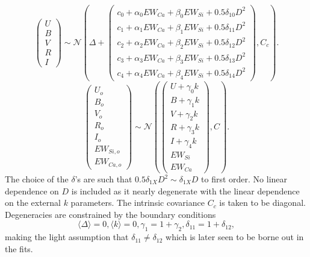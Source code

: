 \documentclass[11pt, oneside]{article}   	%
\begin{document}
\begin{equation*}
\left(
\begin{matrix}
U\\B\\V\\R\\I
\end{matrix}
\right) \sim \mathcal{N}
\left(
\Delta +
\left(
\begin{matrix}
c_0+\alpha_0 EW_{Ca} + \beta_0 EW_{Si}  +0.5 \delta_{10} D^2\\
c_1+\alpha_1 EW_{Ca} + \beta_1 EW_{Si}  +0.5 \delta_{11} D^2\\
c_2+\alpha_2 EW_{Ca} + \beta_2 EW_{Si} +0.5 \delta_{12} D^2\\
c_3+\alpha_3 EW_{Ca} + \beta_3 EW_{Si}  +0.5 \delta_{13} D^2\\
c_4+\alpha_4 EW_{Ca} + \beta_4 EW_{Si}  +0.5 \delta_{14} D^2
\end{matrix}
\right)
,C_{c}
\right).
\end{equation*}
\begin{equation*}
\left(
\begin{matrix}
U_o  \\B_o\\ V_o\\R_o\\I_o\\EW_{Si, o}\\ EW_{Ca, o}
\end{matrix}
\right) \sim \mathcal{N}
\left(
\left(
\begin{matrix}
U +\gamma_0 k \\B +\gamma_1 k \\V+\gamma_2 k\\R+\gamma_3 k\\I+\gamma_4 k\\
EW_{Si}\\ EW_{Ca}
\end{matrix}
\right)
,C
\right).
\end{equation*}
The choice of the $\delta$'s are such that $0.5 \delta_{1X} D^2 \sim \delta_{1X} D$ to first order.
No linear dependence on $D$ is included as it nearly degenerate with the linear dependence on the external $k$ parameters.
The intrinsic covariance $C_c$ is taken to be diagonal.
Degeneracies are constrained by the boundary conditions
\begin{equation*}
\langle \Delta \rangle=0, \langle k \rangle=0, \gamma_1=1+\gamma_2, \delta_{11}=1+\delta_{12},
\end{equation*}
making the light assumption that $\delta_{11} \ne \delta_{12}$ which is later seen to be borne out in the fits.
\end{document}
